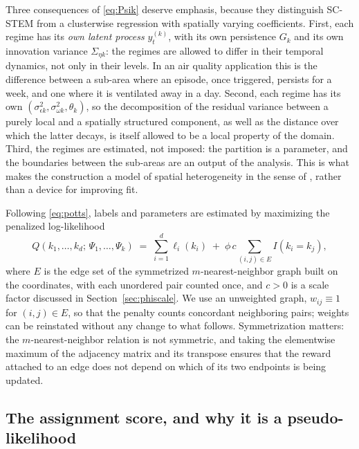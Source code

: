 Three consequences of \eqref{eq:Psik} deserve emphasis, because they distinguish SC-STEM from a clusterwise regression with spatially varying coefficients. First, each regime has its \emph{own latent process} $y^{(k)}_t$, with its own persistence $G_k$ and its own innovation variance $\Sigma_{\eta k}$: the regimes are allowed to differ in their temporal dynamics, not only in their levels. In an air quality application this is the difference between a sub-area where an episode, once triggered, persists for a week, and one where it is ventilated away in a day. Second, each regime has its own $(\sigma^2_{\epsilon k}, \sigma^2_{\omega k}, \theta_k)$, so the decomposition of the residual variance between a purely local and a spatially structured component, as well as the distance over which the latter decays, is itself allowed to be a local property of the domain. Third, the regimes are estimated, not imposed: the partition is a parameter, and the boundaries between the sub-areas are an output of the analysis. This is what makes the construction a model of spatial heterogeneity in the sense of \citet{Goodchild2004}, rather than a device for improving fit.

Following \eqref{eq:potts}, labels and parameters are estimated by maximizing the penalized log-likelihood
\begin{equation}\label{eq:Q}
  Q\!\left(k_1,\ldots,k_d;\, \Psi_1,\ldots,\Psi_k\right)
  \;=\; \sum_{i=1}^{d} \ell_i(k_i)
  \;+\; \phi\, c \sum_{(i,j) \in E} I(k_i = k_j),
\end{equation}
where $E$ is the edge set of the symmetrized $m$-nearest-neighbor graph built on the coordinates, with each unordered pair counted once, and $c > 0$ is a scale factor discussed in Section~\ref{sec:phiscale}. We use an unweighted graph, $w_{ij} \equiv 1$ for $(i,j) \in E$, so that the penalty counts concordant neighboring pairs; weights can be reinstated without any change to what follows. Symmetrization matters: the $m$-nearest-neighbor relation is not symmetric, and taking the elementwise maximum of the adjacency matrix and its transpose ensures that the reward attached to an edge does not depend on which of its two endpoints is being updated.

\subsection{The assignment score, and why it is a pseudo-likelihood}\label{sec2:score}

